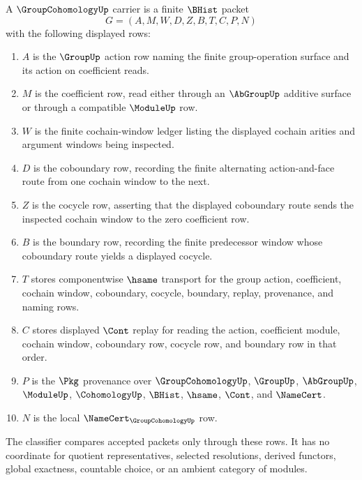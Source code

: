 \begin{definition}
\label{def:group-cohomology-carrier}
A $\GroupCohomologyUp$ carrier is a finite $\BHist$ packet
$$
G=(A,M,W,D,Z,B,T,C,P,N)
$$
with the following displayed rows:
\begin{enumerate}
\item $A$ is the $\GroupUp$ action row naming the finite group-operation surface and its action on coefficient reads.
\item $M$ is the coefficient row, read either through an $\AbGroupUp$ additive surface or through a compatible $\ModuleUp$ row.
\item $W$ is the finite cochain-window ledger listing the displayed cochain arities and argument windows being inspected.
\item $D$ is the coboundary row, recording the finite alternating action-and-face route from one cochain window to the next.
\item $Z$ is the cocycle row, asserting that the displayed coboundary route sends the inspected cochain window to the zero coefficient row.
\item $B$ is the boundary row, recording the finite predecessor window whose coboundary route yields a displayed cocycle.
\item $T$ stores componentwise $\hsame$ transport for the group action, coefficient, cochain window, coboundary, cocycle, boundary, replay, provenance, and naming rows.
\item $C$ stores displayed $\Cont$ replay for reading the action, coefficient module, cochain window, coboundary row, cocycle row, and boundary row in that order.
\item $P$ is the $\Pkg$ provenance over $\GroupCohomologyUp$, $\GroupUp$, $\AbGroupUp$, $\ModuleUp$, $\CohomologyUp$, $\BHist$, $\hsame$, $\Cont$, and $\NameCert$.
\item $N$ is the local $\NameCert_{\GroupCohomologyUp}$ row.
\end{enumerate}
The classifier compares accepted packets only through these rows. It has no coordinate for quotient representatives, selected resolutions, derived functors, global exactness, countable choice, or an ambient category of modules.
\end{definition}

